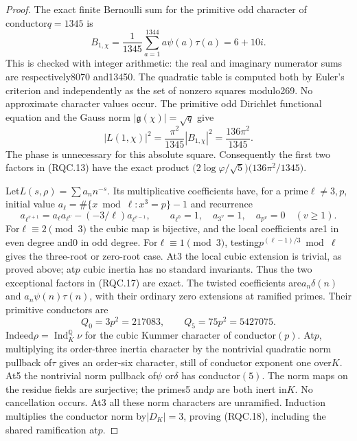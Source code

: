 \begin{proof}
The exact finite Bernoulli sum for the primitive odd character
of conductor$q=1345$ is
\[
 B_{1,\chi}=\frac1{1345}\sum_{a=1}^{1344}a\psi(a)\tau(a)=6+10i.
 \tag{RQC.15}
\]
This is checked with integer arithmetic: the real and imaginary
numerator sums are respectively8070 and13450.  The quadratic table
is computed both by Euler's criterion and independently as the set
of nonzero squares modulo269.  No approximate character values occur.
The primitive odd Dirichlet functional equation and the Gauss norm
$|\mathfrak g(\chi)|=\sqrt q$ give
\[
 |L(1,\chi)|^2=\frac{\pi^2}{1345}|B_{1,\chi}|^2
                   =\frac{136\pi^2}{1345}.
 \tag{RQC.16}
\]
The phase is unnecessary for this absolute square.  Consequently the
first two factors in (RQC.13) have the exact product
$\bigl(2\log\varphi/\sqrt5\bigr)\bigl(136\pi^2/1345\bigr)$.

Let$L(s,\rho)=\sum a_n n^{-s}$.  Its multiplicative coefficients
have, for a prime$\ell\ne3,p$, initial value
$a_\ell=\#\{x\bmod\ell:x^3=p\}-1$ and recurrence
\[
 a_{\ell^{v+1}}=a_\ell a_{\ell^v}
                   -(-3/\ell)a_{\ell^{v-1}},\qquad
 a_{\ell^0}=1,\quad a_{3^v}=1,\quad a_{p^v}=0\quad(v\ge1).
 \tag{RQC.17}
\]
For$\ell\equiv2\pmod3$ the cubic map is bijective, and the local
coefficients are1 in even degree and0 in odd degree.
For$\ell\equiv1\pmod3$, testing$p^{(\ell-1)/3}\bmod\ell$ gives
the three-root or zero-root case.  At3 the local cubic extension
is trivial, as proved above; at$p$ cubic inertia has no standard
invariants.  Thus the two exceptional factors in (RQC.17) are exact.
The twisted coefficients are$a_n\delta(n)$ and
$a_n\psi(n)\tau(n)$, with their ordinary zero extensions at ramified
primes.  Their primitive conductors are
\[
 Q_0=3p^2=217083,\qquad Q_5=75p^2=5427075.
 \tag{RQC.18}
\]
Indeed$\rho=\operatorname{Ind}_{K}^{\mathbb Q}\nu$ for the cubic
Kummer character of conductor$(p)$.  At$p$, multiplying its order-three
inertia character by the nontrivial quadratic norm pullback of$\tau$
gives an order-six character, still of conductor exponent one over$K$.
At5 the nontrivial norm pullback of$\psi$ or$\delta$ has conductor$(5)$.
The norm maps on the residue fields are surjective; the primes5 and$p$
are both inert in$K$.  No cancellation occurs.  At3 all these norm
characters are unramified.  Induction multiplies the conductor norm
by$|D_K|=3$, proving (RQC.18), including the shared ramification at$p$.


\end{proof}
